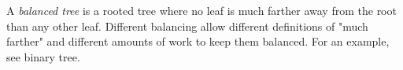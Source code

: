 \documentclass[12pt]{article}
\begin{document}
A \emph{balanced tree } is a rooted tree where no leaf is much farther 
away from the root than any other leaf. 
Different balancing  allow different definitions of "much farther" and 
different amounts of work to keep them balanced. For an example, see binary tree.



\end{document}
